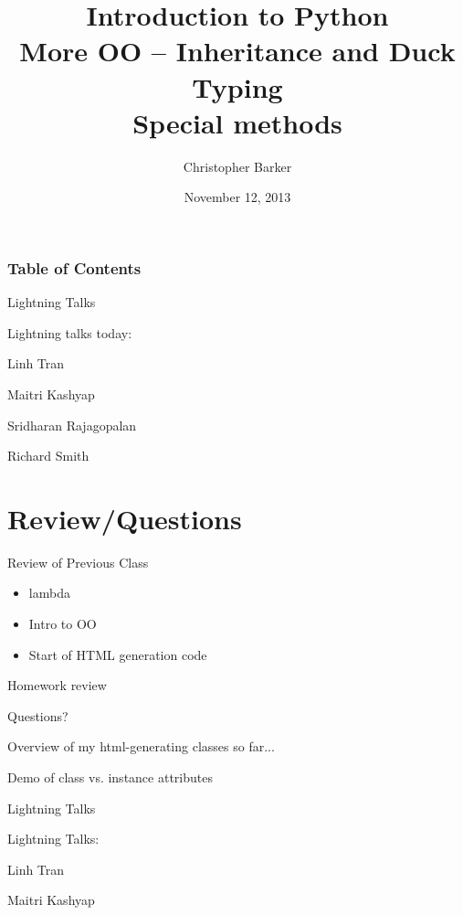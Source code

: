 \documentclass{beamer}
\title[Intro to Python: Week 1]{Introduction  to Python\\ More OO -- Inheritance and Duck Typing \\
Special methods}
\author{Christopher Barker}
\institute{UW Continuing Education}
\date{November 12, 2013}
\begin{document}
\begin{frame}
  \titlepage
\end{frame}

\begin{frame}
\frametitle{Table of Contents}
  \tableofcontents
\end{frame}


\begin{frame}{Lightning Talks}

\vfill
{\LARGE Lightning talks today:}

\vfill
{\Large
 
\vfill
Linh Tran

\vfill
Maitri Kashyap  

\vfill
Sridharan Rajagopalan

\vfill
Richard Smith
}
\vfill

\end{frame}


\section{Review/Questions}

\begin{frame}{Review of Previous Class}

{\LARGE
\begin{itemize}
  \item lambda
  \item Intro to OO
  \item Start of HTML generation code
\end{itemize}
}

\end{frame}


\begin{frame}{Homework review}

  \vfill
  {\Large Questions? }

  \vfill
  {\Large Overview of my html-generating classes so far...}

\vfill
{\Large Demo of class vs. instance attributes}

\end{frame}



\begin{frame}{Lightning Talks}

{\LARGE Lightning Talks:}

\vfill
{\large Linh Tran}

\vfill
{\large Maitri Kashyap}

\end{frame}
\end{document}
